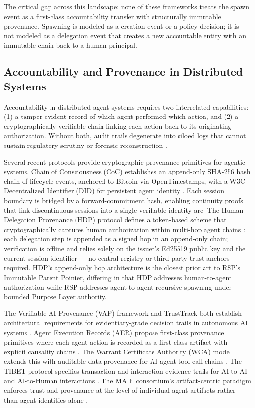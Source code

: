 The critical gap across this landscape: none of these frameworks treats the spawn event as a first-class accountability transfer with structurally immutable provenance. Spawning is modeled as a creation event or a policy decision; it is not modeled as a delegation event that creates a new accountable entity with an immutable chain back to a human principal.

\subsection{Accountability and Provenance in Distributed Systems}

Accountability in distributed agent systems requires two interrelated capabilities: (1) a tamper-evident record of which agent performed which action, and (2) a cryptographically verifiable chain linking each action back to its originating authorization. Without both, audit trails degenerate into siloed logs that cannot sustain regulatory scrutiny or forensic reconstruction \cite{vap2026,trusttrack2025}.

Several recent protocols provide cryptographic provenance primitives for agentic systems. Chain of Consciousness (CoC) establishes an append-only SHA-256 hash chain of lifecycle events, anchored to Bitcoin via OpenTimestamps, with a W3C Decentralized Identifier (DID) for persistent agent identity \cite{chainofconsciousness2026}. Each session boundary is bridged by a forward-commitment hash, enabling continuity proofs that link discontinuous sessions into a single verifiable identity arc. The Human Delegation Provenance (HDP) protocol defines a token-based scheme that cryptographically captures human authorization within multi-hop agent chains \cite{hdp2026}: each delegation step is appended as a signed hop in an append-only chain; verification is offline and relies solely on the issuer's Ed25519 public key and the current session identifier — no central registry or third-party trust anchors required. HDP's append-only hop architecture is the closest prior art to RSP's Immutable Parent Pointer, differing in that HDP addresses human-to-agent authorization while RSP addresses agent-to-agent recursive spawning under bounded Purpose Layer authority.

The Verifiable AI Provenance (VAP) framework and TrustTrack both establish architectural requirements for evidentiary-grade decision trails in autonomous AI systems \cite{vap2026,trusttrack2025}. Agent Execution Records (AER) propose first-class provenance primitives where each agent action is recorded as a first-class artifact with explicit causality chains \cite{aer2025}. The Warrant Certificate Authority (WCA) model extends this with auditable data provenance for AI-agent tool-call chains \cite{wca2025}. The TIBET protocol specifies transaction and interaction evidence trails for AI-to-AI and AI-to-Human interactions \cite{tibet2026}. The MAIF consortium's artifact-centric paradigm enforces trust and provenance at the level of individual agent artifacts rather than agent identities alone \cite{maif2025}.

